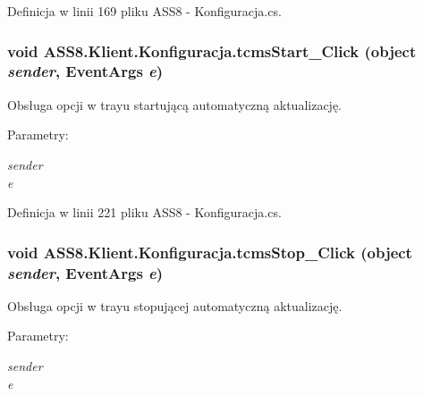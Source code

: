 Definicja w linii 169 pliku ASS8 - Konfiguracja.cs.\hypertarget{a00014_6b5fcbc389c958d850ae624c7c202372}{
\subsubsection[{tcmsStart\_\-Click}]{\setlength{\rightskip}{0pt plus 5cm}void ASS8.Klient.Konfiguracja.tcmsStart\_\-Click (object {\em sender}, \/  EventArgs {\em e})}}
\label{d2/de7/a00014_6b5fcbc389c958d850ae624c7c202372}


Obsługa opcji w trayu startującą automatyczną aktualizację. 

\begin{Desc}
\item[Parametry:]
\begin{description}
\item[{\em sender}]\item[{\em e}]\end{description}
\end{Desc}


Definicja w linii 221 pliku ASS8 - Konfiguracja.cs.\hypertarget{a00014_91afe239346bf7e48bbe5472a7c77dee}{
\subsubsection[{tcmsStop\_\-Click}]{\setlength{\rightskip}{0pt plus 5cm}void ASS8.Klient.Konfiguracja.tcmsStop\_\-Click (object {\em sender}, \/  EventArgs {\em e})}}
\label{d2/de7/a00014_91afe239346bf7e48bbe5472a7c77dee}


Obsługa opcji w trayu stopującej automatyczną aktualizację. 

\begin{Desc}
\item[Parametry:]
\begin{description}
\item[{\em sender}]\item[{\em e}]\end{description}
\end{Desc}



